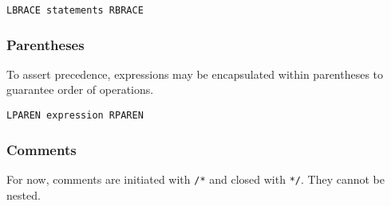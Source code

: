 			\begin{lstlisting}
LBRACE statements RBRACE
			\end{lstlisting}
			
		\subsubsection{Parentheses}
			To assert precedence, expressions may be encapsulated within parentheses to guarantee order of operations. 
			
			\begin{lstlisting}
LPAREN expression RPAREN
			\end{lstlisting}
			
		\subsubsection{Comments}
			For now, comments are initiated with \texttt{/*} and closed with \texttt{*/}. They cannot be nested.
